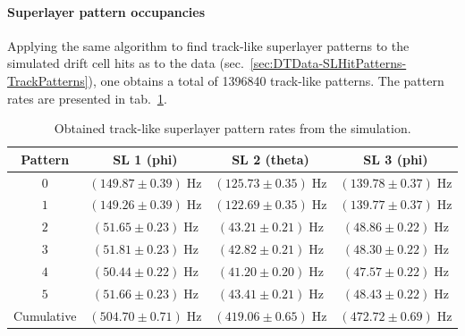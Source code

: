 \paragraph{Superlayer pattern occupancies}
Applying the same algorithm to find track-like superlayer patterns to the simulated drift cell hits as to the data (sec.\ \ref{sec:DTData-SLHitPatterns-TrackPatterns}), one obtains a total of \num{1396840} track-like patterns. The pattern rates are presented in tab.\ \ref{tab:Simulation-PatternOccupancies}.
\begin{table}[htb]
\centering  %
\begin{tabular}{|c|c|c|c|}
\hline
Pattern & \ac{SL} 1 (phi) & \ac{SL} 2 (theta) & \ac{SL} 3 (phi) \\ \hline
$0$ & $(149.87 \pm 0.39)\;\si{\hertz}$ & $(125.73 \pm 0.35)\;\si{\hertz}$ & $(139.78 \pm 0.37)\;\si{\hertz}$ \\
$1$ & $(149.26 \pm 0.39)\;\si{\hertz}$ & $(122.69 \pm 0.35)\;\si{\hertz}$ & $(139.77 \pm 0.37)\;\si{\hertz}$ \\
$2$ & $(51.65 \pm 0.23)\;\si{\hertz}$ & $(43.21 \pm 0.21)\;\si{\hertz}$ & $(48.86 \pm 0.22)\;\si{\hertz}$ \\
$3$ & $(51.81 \pm 0.23)\;\si{\hertz}$ & $(42.82 \pm 0.21)\;\si{\hertz}$ & $(48.30 \pm 0.22)\;\si{\hertz}$ \\
$4$ & $(50.44 \pm 0.22)\;\si{\hertz}$ & $(41.20 \pm 0.20)\;\si{\hertz}$ & $(47.57 \pm 0.22)\;\si{\hertz}$ \\
$5$ & $(51.66 \pm 0.23)\;\si{\hertz}$ & $(43.41 \pm 0.21)\;\si{\hertz}$ & $(48.43 \pm 0.22)\;\si{\hertz}$ \\ \hline
Cumulative & $(504.70 \pm 0.71)\;\si{\hertz}$ & $(419.06 \pm 0.65)\;\si{\hertz}$ & $(472.72 \pm 0.69)\;\si{\hertz}$ \\ \hline
\end{tabular}
\caption{Obtained track-like superlayer pattern rates from the simulation.}
\label{tab:Simulation-PatternOccupancies}
\end{table}

\FloatBarrier
\clearpage
